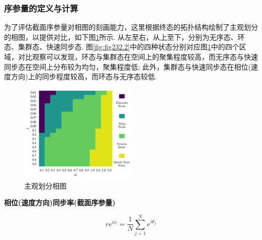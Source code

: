 \documentclass{article}
\begin{document}
\subsubsection{序参量的定义与计算}

为了评估截面序参量对相图的刻画能力，这里根据终态的拓扑结构绘制了主观划分的相图，以提供对比，如下图\ref{fig:fig234.1}所示. 从左至右，从上至下，分别为无序态、环态、集群态、快速同步态. 图\ref{fig:fig232.2}中的四种状态分别对应图\ref{fig:fig234.1}中的四个区域，对比观察可以发现，环态与集群态在空间上的聚集程度较高，而无序态与快速同步态在空间上分布较为均匀，聚集程度低; 此外，集群态与快速同步态在相位(速度方向)上的同步程度较高，而环态与无序态较低.

\begin{figure}[H]
	\centering
	\includegraphics[width=0.5\textwidth]{./figs/subjectiveOp.png}
	\vspace{-0.5cm}
	\caption{主观划分相图}
	\label{fig:fig234.1}
\end{figure}
\vspace{-0.5cm}

\noindent\textbf{相位(速度方向)同步率(截面序参量)}

$$
r e^{i\psi}=\frac{1}{N}\sum_{j=1}^{N}{e^{i\theta _j}}
$$
\end{document}
